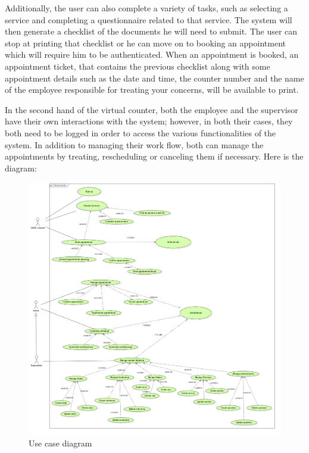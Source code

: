  Additionally, the user can also complete a variety of tasks, such as selecting a service and completing a questionnaire related to that service. The system will then generate a checklist of the documents he will need to submit. The user can stop at printing that checklist or he can move on to booking an appointment which will require him to be authenticated. When an appointment is booked, an appointment ticket, that contains the previous checklist along with some appointment details such as the date and time, the counter number and the name of the employee responsible for treating your concerns,  will be available to print. 
 
 \medskip In the second hand of the virtual counter, both the employee and the supervisor have their own interactions with the system; however, in both their cases, they both need to be logged in order to access the various functionalities of the system. In addition to managing their work flow, both can manage the appointments by treating, rescheduling or canceling them if necessary. 
\newpage
 \medskip Here is the diagram:

 \begin{figure}[H]
    \centering
    \includegraphics[width=1.0\textwidth]{UseCase.PNG}
    \caption{Use case diagram}

    \label{ucdiagram}
 \end{figure}
 \newpage
